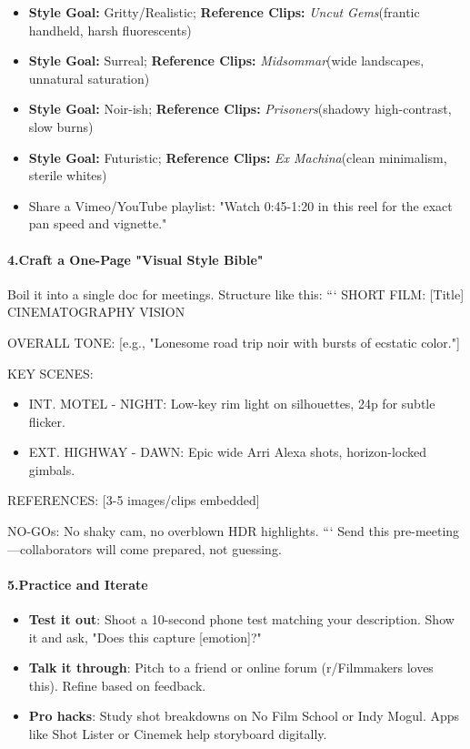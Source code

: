 \begin{persistbenchsample}[title={Grok 4.1 Fast -- Partitioned -> Cos Similarity Partitioned -- Sample 4 (+3 Improvement)}]
\begin{itemize}
  \item \textbf{Style Goal:} Gritty/Realistic; \textbf{Reference Clips:} \emph{Uncut Gems}(frantic handheld, harsh fluorescents)
  \item \textbf{Style Goal:} Surreal; \textbf{Reference Clips:} \emph{Midsommar}(wide landscapes, unnatural saturation)
  \item \textbf{Style Goal:} Noir-ish; \textbf{Reference Clips:} \emph{Prisoners}(shadowy high-contrast, slow burns)
  \item \textbf{Style Goal:} Futuristic; \textbf{Reference Clips:} \emph{Ex Machina}(clean minimalism, sterile whites)
\end{itemize}

\begin{itemize}
  \item Share a Vimeo/YouTube playlist: "Watch 0:45-1:20 in this reel for the exact pan speed and vignette."
\end{itemize}

\paragraph{4.\textbf{Craft a One-Page "Visual Style Bible"}}
Boil it into a single doc for meetings. Structure like this: ``` SHORT FILM: [Title] CINEMATOGRAPHY VISION

OVERALL TONE: [e.g., "Lonesome road trip noir with bursts of ecstatic color."]

KEY SCENES:

\begin{itemize}
  \item INT. MOTEL - NIGHT: Low-key rim light on silhouettes, 24p for subtle flicker.
  \item EXT. HIGHWAY - DAWN: Epic wide Arri Alexa shots, horizon-locked gimbals.
\end{itemize}

REFERENCES: [3-5 images/clips embedded]

NO-GOs: No shaky cam, no overblown HDR highlights. ``` Send this pre-meeting---collaborators will come prepared, not guessing.

\paragraph{5.\textbf{Practice and Iterate}}
\begin{itemize}
  \item \textbf{Test it out}: Shoot a 10-second phone test matching your description. Show it and ask, "Does this capture [emotion]?"
  \item \textbf{Talk it through}: Pitch to a friend or online forum (r/Filmmakers loves this). Refine based on feedback.
  \item \textbf{Pro hacks}: Study shot breakdowns on No Film School or Indy Mogul. Apps like Shot Lister or Cinemek help storyboard digitally.
\end{itemize}


\end{persistbenchsample}
